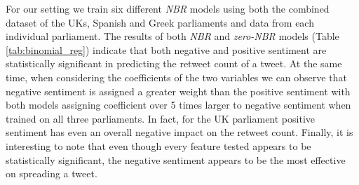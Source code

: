 For our setting we train six different \textit{NBR} models using both the combined dataset of the UKs, Spanish and Greek parliaments and data from each individual parliament. The results of both \textit{NBR} and \textit{zero-NBR} models (Table \ref{tab:binomial_reg}) indicate that both negative and positive sentiment are statistically significant in predicting the retweet count of a tweet. At the same time, when considering the coefficients of the two variables we can observe that negative sentiment is assigned a greater weight than the positive sentiment with both models assigning  coefficient over 5 times larger to negative sentiment when trained on all three parliaments. In fact, for the UK parliament positive sentiment has even an overall negative impact on the retweet count. Finally, it is interesting to note that even though every feature tested appears to be statistically significant, the negative sentiment appears to be the most effective on spreading a tweet. %

